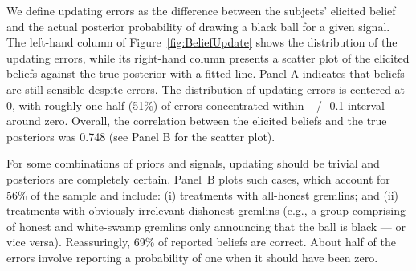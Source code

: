 \documentclass[12pt,a4paper]{article}
\begin{document}
\begin{figure}[H]
	\hfill
	\hfill
\end{figure}

We define updating errors as the difference between the subjects' elicited belief and the actual posterior probability of drawing a black ball for a given signal.  The left-hand column of Figure~\ref{fig:BeliefUpdate} shows the distribution of the updating errors, while its right-hand column presents a scatter plot of the elicited beliefs against the true posterior with a fitted line.
Panel A indicates that beliefs are still sensible despite errors. The distribution of updating errors is centered at 0, with roughly one-half (51\%) of errors concentrated within +/- 0.1 interval around zero. Overall, the correlation between the elicited beliefs and the true posteriors was 0.748 (see Panel B for the scatter plot).  

For some combinations of priors and signals, updating should be trivial and posteriors are completely certain.  
Panel~B plots such cases, which account for 56\% of the sample and include: (i) treatments with all-honest gremlins; and (ii) treatments with obviously irrelevant dishonest gremlins (e.g., a group comprising of honest and white-swamp gremlins only announcing that the ball is black --- or vice versa). Reassuringly, 69\% of reported beliefs are correct. About half of the errors involve reporting a probability of one when it should have been zero.
\end{document}
